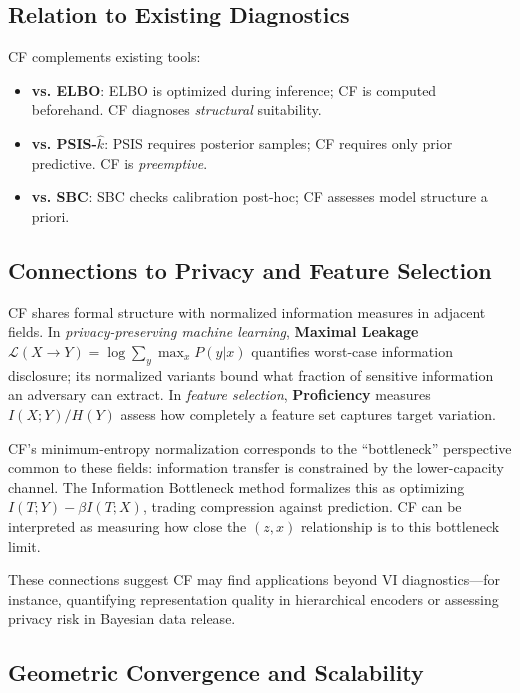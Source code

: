 \documentclass[10pt]{article} %
\theoremstyle{plain}
\theoremstyle{definition}
\begin{document}
\subsection{Relation to Existing Diagnostics}

CF complements existing tools:
\begin{itemize}
    \item \textbf{vs. ELBO}: ELBO is optimized during inference; CF is computed beforehand. CF diagnoses \emph{structural} suitability.
    \item \textbf{vs. PSIS-$\hat{k}$}: PSIS requires posterior samples; CF requires only prior predictive. CF is \emph{preemptive}.
    \item \textbf{vs. SBC}: SBC checks calibration post-hoc; CF assesses model structure a priori.
\end{itemize}

\subsection{Connections to Privacy and Feature Selection}

CF shares formal structure with normalized information measures in adjacent fields. In \emph{privacy-preserving machine learning}, \textbf{Maximal Leakage} $\mathcal{L}(X \to Y) = \log \sum_y \max_x P(y|x)$ quantifies worst-case information disclosure; its normalized variants bound what fraction of sensitive information an adversary can extract. In \emph{feature selection}, \textbf{Proficiency} measures $I(X;Y)/H(Y)$ assess how completely a feature set captures target variation.

CF's minimum-entropy normalization corresponds to the ``bottleneck'' perspective common to these fields: information transfer is constrained by the lower-capacity channel. The Information Bottleneck method \citep{tishby1999information} formalizes this as optimizing $I(T;Y) - \beta I(T;X)$, trading compression against prediction. CF can be interpreted as measuring how close the $(z,x)$ relationship is to this bottleneck limit.

These connections suggest CF may find applications beyond VI diagnostics---for instance, quantifying representation quality in hierarchical encoders or assessing privacy risk in Bayesian data release.

\subsection{Geometric Convergence and Scalability}
\end{document}
